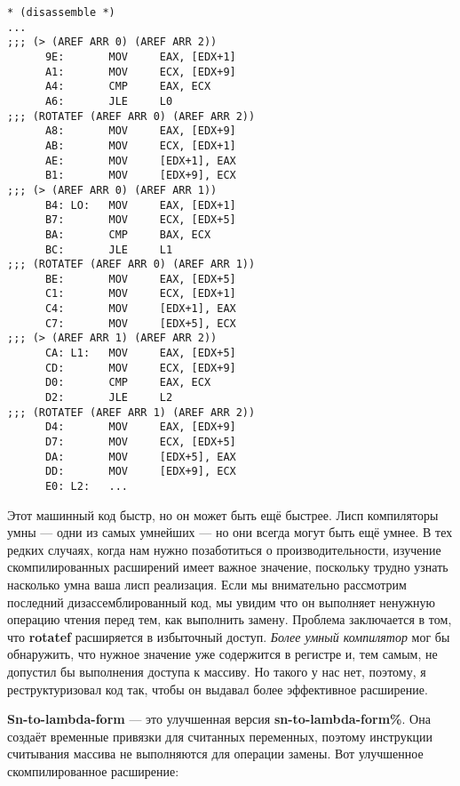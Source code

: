\begin{verbatim}
* (disassemble *)
...
;;; (> (AREF ARR 0) (AREF ARR 2))
      9E:       MOV     EAX, [EDX+1]
      A1:       MOV     ECX, [EDX+9]
      A4:       CMP     EAX, ECX
      A6:       JLE     L0
;;; (ROTATEF (AREF ARR 0) (AREF ARR 2))
      A8:       MOV     EAX, [EDX+9]
      AB:       MOV     ECX, [EDX+1]
      AE:       MOV     [EDX+1], EAX
      B1:       MOV     [EDX+9], ECX
;;; (> (AREF ARR 0) (AREF ARR 1))
      B4: LO:   MOV     EAX, [EDX+1]
      B7:       MOV     ECX, [EDX+5]
      BA:       CMP     BAX, ECX
      BC:       JLE     L1
;;; (ROTATEF (AREF ARR 0) (AREF ARR 1))
      BE:       MOV     EAX, [EDX+5]
      C1:       MOV     ECX, [EDX+1]
      C4:       MOV     [EDX+1], EAX
      C7:       MOV     [EDX+5], ECX
;;; (> (AREF ARR 1) (AREF ARR 2))
      CA: L1:   MOV     EAX, [EDX+5]
      CD:       MOV     ECX, [EDX+9]
      D0:       CMP     EAX, ECX
      D2:       JLE     L2
;;; (ROTATEF (AREF ARR 1) (AREF ARR 2))
      D4:       MOV     EAX, [EDX+9]
      D7:       MOV     ECX, [EDX+5]
      DA:       MOV     [EDX+5], EAX
      DD:       MOV     [EDX+9], ECX
      E0: L2:   ...
\end{verbatim}

Этот машинный код быстр, но он может быть ещё быстрее. Лисп компиляторы умны --- одни из самых умнейших --- но они всегда могут быть ещё умнее. В тех редких случаях, когда нам нужно позаботиться о производительности, изучение скомпилированных расширений имеет важное значение, поскольку трудно узнать насколько умна ваша лисп реализация. Если мы внимательно рассмотрим последний дизассемблированный код, мы увидим что он выполняет ненужную операцию чтения перед тем, как выполнить замену. Проблема заключается в том, что \textbf{rotatef} расширяется в избыточный доступ. \emph{Более умный компилятор} мог бы обнаружить, что нужное значение уже содержится в регистре и, тем самым, не допустил бы выполнения доступа к массиву. Но такого у нас нет, поэтому, я реструктуризовал код так, чтобы он выдавал более эффективное расширение.

\textbf{Sn-to-lambda-form} --- это улучшенная версия \textbf{sn-to-lambda-form\%}. Она создаёт временные привязки для считанных переменных, поэтому инструкции считывания массива не выполняются для операции замены. Вот улучшенное скомпилированное расширение:

